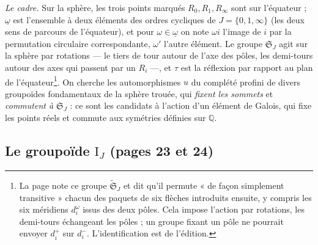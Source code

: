 \documentclass[11pt,a4paper]{article}
\begin{document}
\emph{Le cadre.} Sur la sphère, les trois points marqués $R_0, R_1, R_\infty$
sont sur l'équateur ; $\underline{\omega}$ est l'ensemble à deux éléments des
ordres cycliques de $J = \{0, 1, \infty\}$ (les deux sens de parcours de
l'équateur), et pour $\omega \in \underline{\omega}$ on note $\omega i$
l'image de $i$ par la permutation circulaire correspondante, $\omega'$ l'autre
élément. Le groupe $\mathfrak{S}_J$ agit sur la sphère par rotations — le
tiers de tour autour de l'axe des pôles, les demi-tours autour des axes qui
passent par un $R_i$ —, et $\tau$ est la réflexion par rapport au plan de
l'équateur\footnote{La page note ce groupe $\widetilde{\mathfrak{S}}_J$ et dit
qu'il permute « de façon simplement transitive » chacun des paquets de six
flèches introduits ensuite, y compris les six méridiens $d_i^{\omega}$ issus
des deux pôles. Cela impose l'action par rotations, les demi-tours échangeant
les pôles ; un groupe fixant un pôle ne pourrait envoyer $d_i^{+}$ sur
$d_i^{-}$. L'identification est de l'édition.}. On cherche les automorphismes
$u$ du complété profini de divers groupoïdes fondamentaux de la sphère
trouée, qui \emph{fixent les sommets} et \emph{commutent à $\mathfrak{S}_J$} :
ce sont les candidats à l'action d'un élément de Galois, qui fixe les points
réels et commute aux symétries définies sur $\mathbb{Q}$.

\subsection*{Le groupoïde $\mathrm{I}_J$ (pages 23 et 24)}
\end{document}

